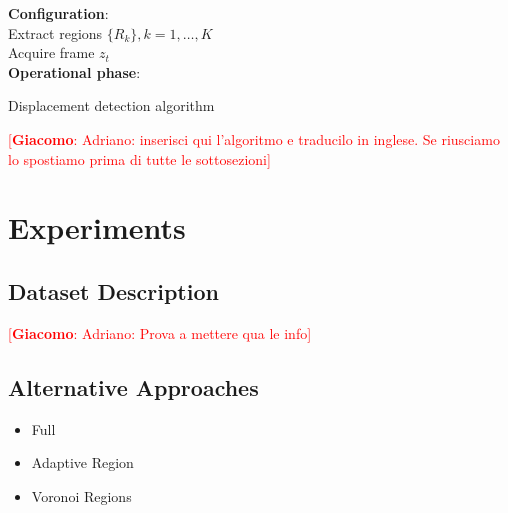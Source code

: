 \documentclass{llncs}
\newcommand{\gi}[1]{{\textcolor{red}{[\small \textbf{Giacomo}: #1]}}}
\begin{document}
\begin{algorithm}[tp]
	\LinesNumbered
	\textbf{Configuration}:\\
	 Extract regions $\{R_k\}, k=1,\dots,K$  \\
	 
	{	 Acquire frame $z_t$ \\
		 
	}
	 
	\textbf{Operational phase}:\\
	    
	\caption{Displacement detection algorithm}
	\label{alg:DISPL}
\end{algorithm}
\gi{Adriano: inserisci qui l'algoritmo e traducilo in inglese. Se riusciamo lo spostiamo prima di tutte le sottosezioni}

\section{Experiments}\label{sec:experiments}

\subsection{Dataset Description}\label{subsec:Dataset}
\gi{Adriano: Prova a mettere qua le info}

\subsection{Alternative Approaches}\label{subsec:AlternativeApproach	es}
\begin{itemize}
\item Full
\item Adaptive Region
\item Voronoi Regions
\end{itemize}
\end{document}
